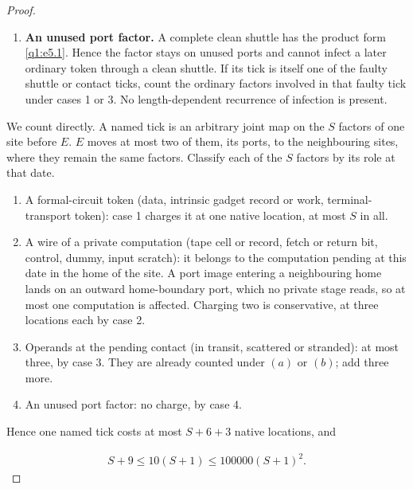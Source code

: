 \begin{proof}
\begin{enumerate}[label=\textup{Case \arabic*.},leftmargin=*]
\item \textbf{An unused port factor.} A complete clean shuttle has the product form \eqref{q1:e5.1}. Hence the factor stays on unused ports and cannot infect a later ordinary token through a clean shuttle. If its tick is itself one of the faulty shuttle or contact ticks, count the ordinary factors involved in that faulty tick under cases 1 or 3. No length-dependent recurrence of infection is present.
\end{enumerate}

We count directly. A named tick is an arbitrary joint map on the \(S\) factors of one site before \(E\). \(E\) moves at most two of them, its ports, to the neighbouring sites, where they remain the same factors. Classify each of the \(S\) factors by its role at that date.
\begin{enumerate}[label=\textup{(\alph*)}]
\item A formal-circuit token (data, intrinsic gadget record or work, terminal-transport token): case 1 charges it at one native location, at most \(S\) in all.
\item A wire of a private computation (tape cell or record, fetch or return bit, control, dummy, input scratch): it belongs to the computation pending at this date in the home of the site. A port image entering a neighbouring home lands on an outward home-boundary port, which no private stage reads, so at most one computation is affected. Charging two is conservative, at three locations each by case 2.
\item Operands at the pending contact (in transit, scattered or stranded): at most three, by case 3. They are already counted under \((a)\) or \((b)\); add three more.
\item An unused port factor: no charge, by case 4.
\end{enumerate}
Hence one named tick costs at most \(S+6+3\) native locations, and

\begin{equation}\label{q1:e5.2}
\begin{gathered}
S+9 \le  10(S+1) \le  100000(S+1)^{2}.
\end{gathered}
\end{equation}


\end{proof}
